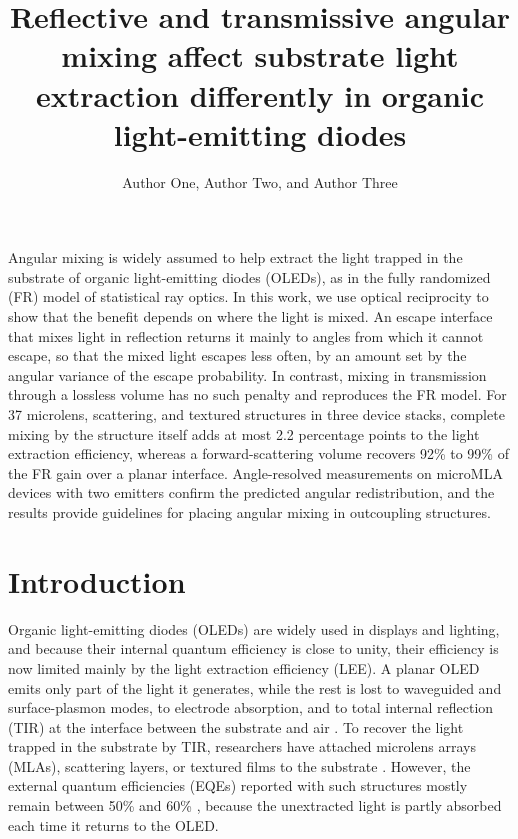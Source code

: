 \documentclass{optica-article}
\begin{document}
\title{Reflective and transmissive angular mixing affect substrate light extraction differently in organic light-emitting diodes}

\author{Author One, Author Two, and Author Three}
\address{[Affiliation, Address]}


\begin{abstract*}
Angular mixing is widely assumed to help extract the light trapped in the substrate of organic light-emitting diodes (OLEDs), as in the fully randomized (FR) model of statistical ray optics. In this work, we use optical reciprocity to show that the benefit depends on where the light is mixed. An escape interface that mixes light in reflection returns it mainly to angles from which it cannot escape, so that the mixed light escapes less often, by an amount set by the angular variance of the escape probability. In contrast, mixing in transmission through a lossless volume has no such penalty and reproduces the FR model. For 37 microlens, scattering, and textured structures in three device stacks, complete mixing by the structure itself adds at most 2.2 percentage points to the light extraction efficiency, whereas a forward-scattering volume recovers 92\% to 99\% of the FR gain over a planar interface. Angle-resolved measurements on microMLA devices with two emitters confirm the predicted angular redistribution, and the results provide guidelines for placing angular mixing in outcoupling structures.
\end{abstract*}


\section{Introduction}

Organic light-emitting diodes (OLEDs) are widely used in displays and lighting, and because their internal quantum efficiency is close to unity, their efficiency is now limited mainly by the light extraction efficiency (LEE). A planar OLED emits only part of the light it generates, while the rest is lost to waveguided and surface-plasmon modes, to electrode absorption, and to total internal reflection (TIR) at the interface between the substrate and air \cite{r1,r2}. To recover the light trapped in the substrate by TIR, researchers have attached microlens arrays (MLAs), scattering layers, or textured films to the substrate \cite{r3,r4,r5,r6,r7}. However, the external quantum efficiencies (EQEs) reported with such structures mostly remain between 50\% and 60\% \cite{r8,r9}, because the unextracted light is partly absorbed each time it returns to the OLED.
\end{document}
